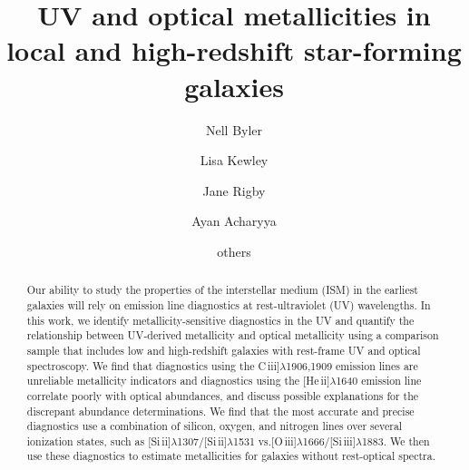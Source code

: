 \documentclass[preprint2]{aastex62}
\newcommand{\oiii}{[O\,{\sc iii}]\xspace}
\newcommand{\heii}{[He\,{\sc ii}]\xspace}
\newcommand{\SiuII}{[Si\,{\sc ii}]\xspace}
\newcommand{\SiuIII}{[Si\,{\sc iii}]\xspace}
\newcommand{\ciii}{C\,{\sc iii}]\xspace}
\newcommand\vs{\ensuremath{\mathrm{vs.}}\xspace}
\begin{document}
\title{UV and optical metallicities in local and high-redshift star-forming galaxies}
\author[0000-0002-7392-3637]{Nell Byler}
\author[0000-0001-8152-3943]{Lisa Kewley}
\author[0000-0002-7627-6551]{Jane Rigby}
\author[0000-0003-4804-7142]{Ayan Acharyya}

\author{others}
\begin{abstract}

Our ability to study the properties of the interstellar medium (ISM) in the earliest galaxies will rely on emission line diagnostics at rest-ultraviolet (UV) wavelengths. In this work, we identify metallicity-sensitive diagnostics in the UV and quantify the relationship between UV-derived metallicity and optical metallicity using a comparison sample that includes low and high-redshift galaxies with rest-frame UV and optical spectroscopy. We find that diagnostics using the \ciii$\lambda$1906,1909 emission lines are unreliable metallicity indicators and diagnostics using the \heii$\lambda$1640 emission line correlate poorly with optical abundances, and discuss possible explanations for the discrepant abundance determinations. We find that the most accurate and precise diagnostics use a combination of silicon, oxygen, and nitrogen lines over several ionization states, such as \SiuII$\lambda$1307/\SiuII$\lambda$1531 \vs \oiii$\lambda$1666/\SiuIII$\lambda$1883. We then use these diagnostics to estimate metallicities for galaxies without rest-optical spectra.
\end{abstract}
\end{document}
